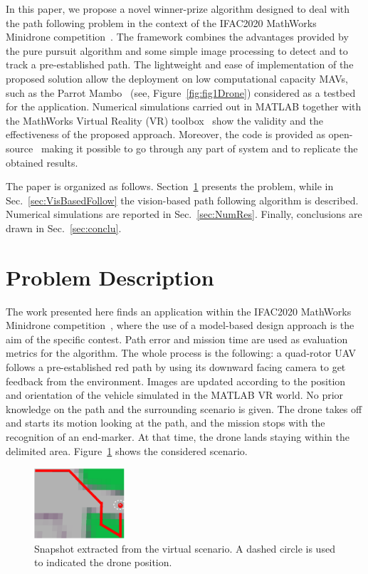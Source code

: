 \documentclass[a4paper,twocolumn,10pt]{article}
\begin{document}
    In this paper, we propose a novel winner-prize algorithm designed to deal with the path following problem in the context of the IFAC2020 MathWorks Minidrone 
    competition~\cite{4_Mathworks_url}. The framework combines the advantages provided by the pure pursuit algorithm and some simple image processing to detect and to track a pre-established path. The lightweight and ease of implementation of the proposed solution allow the deployment on low computational 
    capacity MAVs, such as the Parrot Mambo~\cite{15_Mathworks_url} (see, Figure~\ref{fig:fig1Drone}) considered as a testbed for the application. Numerical simulations 
    carried out in MATLAB together with the MathWorks Virtual Reality (VR) toolbox~\cite{SilanoMATFly} show the validity and the effectiveness of the proposed approach. Moreover, the code is provided as 
    open-source~\cite{GitHubCode} making it possible to go through any part of system and to replicate the obtained results. 

    The paper is organized as follows. Section~\ref{sec:probDesc} presents the problem, while in Sec.~\ref{sec:VisBasedFollow} the vision-based path following algorithm is 
    described. Numerical simulations are reported in Sec.~\ref{sec:NumRes}. Finally, conclusions are drawn in Sec.~\ref{sec:conclu}. 

    \section{Problem Description}
    \label{sec:probDesc}

    The work presented here finds an application within the IFAC2020 MathWorks Minidrone competition~\cite{4_Mathworks_url}, where the use of a model-based design approach is the aim of the specific contest. Path error and mission time are used as evaluation metrics for the algorithm. The whole process is the following: a quad-rotor UAV follows a pre-established red path by using its downward facing camera to get feedback from the environment. Images are updated according to the position and orientation of the vehicle simulated in the MATLAB VR world. No prior knowledge on the path and the surrounding scenario is given. The drone takes off and starts its  motion looking at the path, and the mission stops with the recognition of an end-marker. At that time, the drone lands staying within the delimited area. 
    Figure~\ref{fig:fig2track} shows the considered scenario. 

    \begin{figure}
        \centering
        \includegraphics[width=0.3\textwidth]{pics/fig2_track.png}
        \caption{Snapshot extracted from the virtual scenario. A dashed circle is used to indicated the drone position.}
        \label{fig:fig2track}
    \end{figure}
\end{document}
